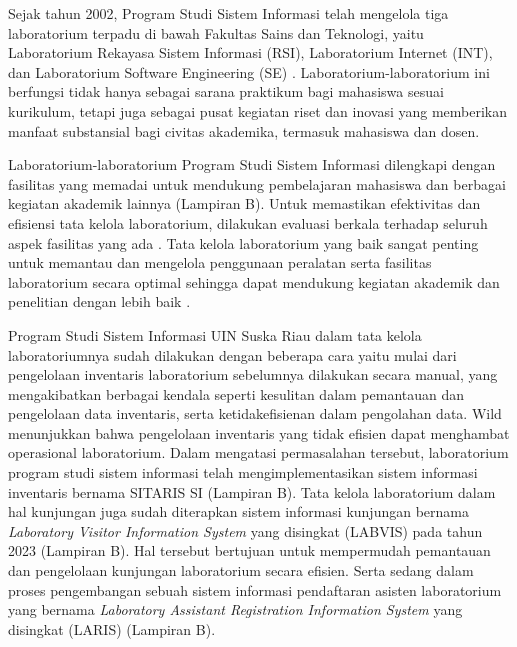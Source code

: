 Sejak tahun 2002, Program Studi Sistem Informasi telah mengelola tiga laboratorium terpadu di bawah Fakultas Sains dan Teknologi, yaitu Laboratorium Rekayasa Sistem Informasi (RSI), Laboratorium Internet (INT), dan Laboratorium Software Engineering (SE) \cite{lab-si-website}. Laboratorium-laboratorium ini berfungsi tidak hanya sebagai sarana praktikum bagi mahasiswa sesuai kurikulum, tetapi juga sebagai pusat kegiatan riset dan inovasi yang memberikan manfaat substansial bagi civitas akademika, termasuk mahasiswa dan dosen.

Laboratorium-laboratorium Program Studi Sistem Informasi dilengkapi dengan fasilitas yang memadai untuk mendukung pembelajaran mahasiswa dan berbagai kegiatan akademik lainnya (Lampiran B). Untuk memastikan efektivitas dan efisiensi tata kelola laboratorium, dilakukan evaluasi berkala terhadap seluruh aspek fasilitas yang ada \cite{lab-si-website}. Tata kelola laboratorium yang baik sangat penting untuk memantau dan mengelola penggunaan peralatan serta fasilitas laboratorium secara optimal sehingga dapat mendukung kegiatan akademik dan penelitian dengan lebih baik \cite{dongapure2024good}.

Program Studi Sistem Informasi UIN Suska Riau dalam tata kelola laboratoriumnya sudah dilakukan dengan beberapa cara yaitu mulai dari pengelolaan inventaris laboratorium sebelumnya dilakukan secara manual, yang mengakibatkan berbagai kendala seperti kesulitan dalam pemantauan dan pengelolaan data inventaris, serta ketidakefisienan dalam pengolahan data. Wild \citeyear{smith2021agile} menunjukkan bahwa pengelolaan inventaris yang tidak efisien dapat menghambat operasional laboratorium. Dalam mengatasi permasalahan tersebut, laboratorium program studi sistem informasi telah mengimplementasikan sistem informasi inventaris bernama SITARIS SI (Lampiran B). Tata kelola laboratorium dalam hal kunjungan juga sudah diterapkan sistem informasi kunjungan bernama \textit{Laboratory Visitor Information System} yang disingkat (LABVIS) pada tahun 2023 (Lampiran B). Hal tersebut bertujuan untuk mempermudah pemantauan dan pengelolaan kunjungan laboratorium secara efisien. Serta sedang dalam proses pengembangan sebuah sistem informasi pendaftaran asisten laboratorium yang bernama \textit{Laboratory Assistant Registration Information System} yang disingkat (LARIS) (Lampiran B).


